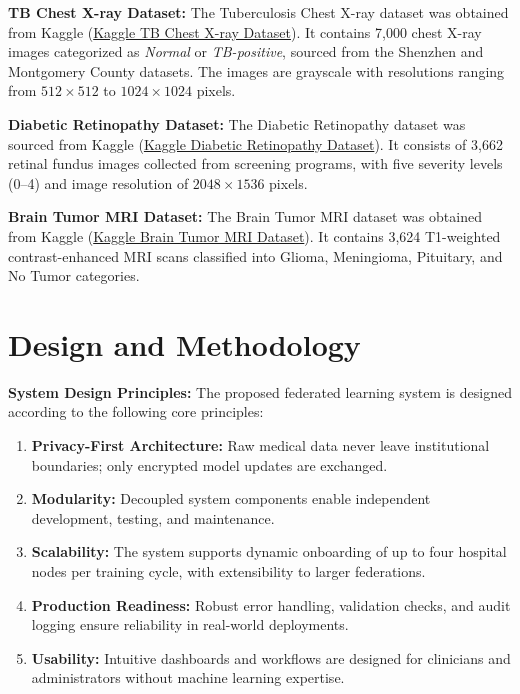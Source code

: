 \textbf{TB Chest X-ray Dataset:}  
The Tuberculosis Chest X-ray dataset was obtained from Kaggle 
(\href{https://www.kaggle.com/datasets/tawsifurrahman/tuberculosis-tb-chest-xray-dataset}{Kaggle TB Chest X-ray Dataset}). 
It contains 7,000 chest X-ray images categorized as \textit{Normal} or \textit{TB-positive}, sourced from the Shenzhen and Montgomery County datasets. The images are grayscale with resolutions ranging from $512 \times 512$ to $1024 \times 1024$ pixels.

\textbf{Diabetic Retinopathy Dataset:}  
The Diabetic Retinopathy dataset was sourced from Kaggle 
(\href{https://www.kaggle.com/datasets/sovitrath/diabetic-retinopathy-224x224-2019-data}{Kaggle Diabetic Retinopathy Dataset}). 
It consists of 3,662 retinal fundus images collected from screening programs, with five severity levels (0--4) and image resolution of $2048 \times 1536$ pixels.

\textbf{Brain Tumor MRI Dataset:}  
The Brain Tumor MRI dataset was obtained from Kaggle 
(\href{https://www.kaggle.com/datasets/masoudnickparvar/brain-tumor-mri-dataset}{Kaggle Brain Tumor MRI Dataset}). 
It contains 3,624 T1-weighted contrast-enhanced MRI scans classified into Glioma, Meningioma, Pituitary, and No Tumor categories.


\section{Design and Methodology}

\textbf{System Design Principles:}
The proposed federated learning system is designed according to the following core principles:

\begin{enumerate}
    \item \textbf{Privacy-First Architecture:} Raw medical data never leave institutional boundaries; only encrypted model updates are exchanged.
    \item \textbf{Modularity:} Decoupled system components enable independent development, testing, and maintenance.
    \item \textbf{Scalability:} The system supports dynamic onboarding of up to four hospital nodes per training cycle, with extensibility to larger federations.
    \item \textbf{Production Readiness:} Robust error handling, validation checks, and audit logging ensure reliability in real-world deployments.
    \item \textbf{Usability:} Intuitive dashboards and workflows are designed for clinicians and administrators without machine learning expertise.
\end{enumerate}

